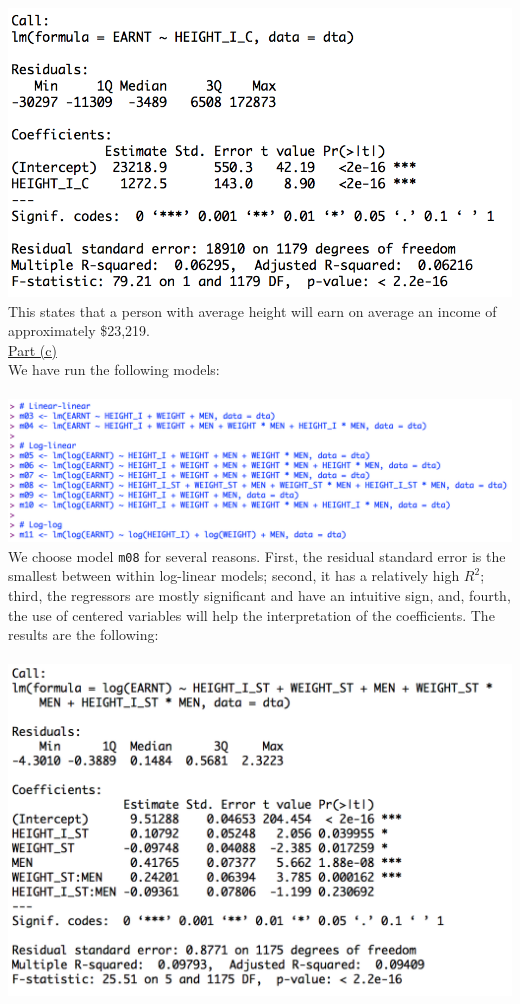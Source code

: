 \documentclass[a4paper, 11pt]{article}
\begin{document}
\includegraphics[scale=0.7]{reg2.png}
\newline This states that a person with average height will earn on average an income of approximately \$23,219.\\
\newline \underline{Part (c)}\\
\newline We have run the following models:\\
\newline \\
\includegraphics[scale=0.6]{reg3.png}
\newline \\
\newline We choose model \texttt{m08} for several reasons. First, the residual standard error is the smallest between within log-linear models; second, it has a relatively high $R^2$; third, the regressors are mostly significant and have an intuitive sign, and, fourth, the use of centered variables will help the interpretation of the coefficients. The results are the following:\\
\newline \\
\includegraphics[scale=0.7]{reg4.png}
\end{document}
